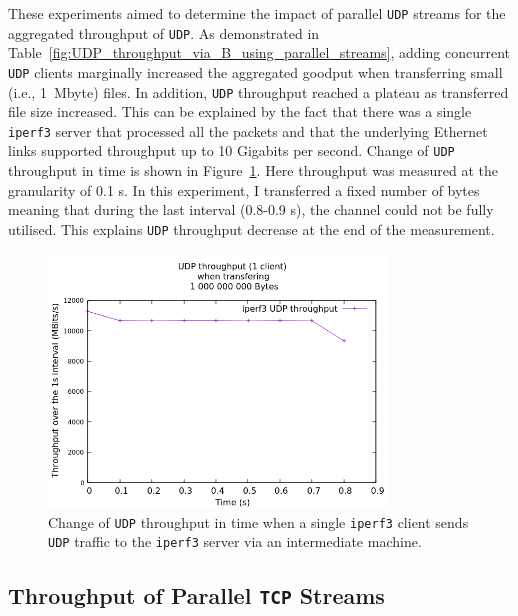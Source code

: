 \documentclass[12pt,a4paper]{report}
\begin{document}
These experiments aimed to determine the impact of parallel \texttt{UDP} streams for the aggregated throughput of \texttt{UDP}.
As demonstrated in Table~\ref{fig:UDP_throughput_via_B_using_parallel_streams}, adding concurrent \texttt{UDP} clients marginally increased the aggregated goodput when transferring small (i.e., 1~Mbyte) files.
In addition, \texttt{UDP} throughput reached a plateau as transferred file size increased.
This can be explained by the fact that there was a single \texttt{iperf3} server that processed all the packets and that the underlying Ethernet links supported throughput up to 10 Gigabits per second.
Change of \texttt{UDP} throughput in time is shown in Figure~\ref{fig:UDP_throughput_in_time}.
Here throughput was measured at the granularity of 0.1 s.
In this experiment, I transferred a fixed number of bytes meaning that during the last interval (0.8-0.9 s), the channel could not be fully utilised.
This explains \texttt{UDP} throughput decrease at the end of the measurement. 


    \begin{figure}[ht]
    \centering
    \includegraphics[width=0.8\textwidth]{figs/UDP_throughput_in_time.png}
    \caption[Change of \texttt{UDP} throughput in time when a single \texttt{iperf3} client sends \texttt{UDP} traffic to the \texttt{iperf3} server via an intermediate machine]{Change of \texttt{UDP} throughput in time when a single \texttt{iperf3} client sends \texttt{UDP} traffic to the \texttt{iperf3} server via an intermediate machine.}
    \label{fig:UDP_throughput_in_time}
    \end{figure}

\subsection{Throughput of Parallel \texttt{TCP} Streams}
\end{document}
